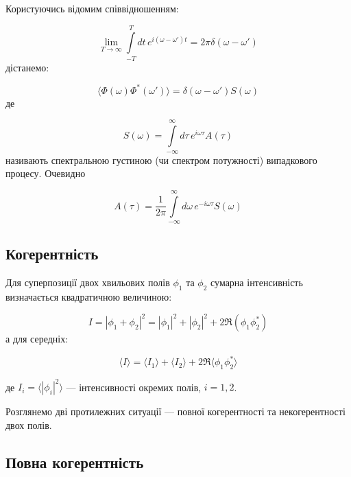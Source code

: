 Користуючись відомим співвідношенням:

\begin{equation*}
\lim_{T \to \infty} \int\limits_{-T}^{T} dt \, e^{i(\omega - \omega')t} = 2\pi \delta(\omega - \omega')
\end{equation*}
дістанемо:

\begin{equation}
\langle \Phi(\omega) \Phi^{*}(\omega') \rangle = \delta(\omega - \omega') S(\omega)
\label{eq:spectral_density}
\end{equation}
де

\begin{equation*}
S(\omega) = \int\limits_{-\infty}^{\infty} d\tau \, e^{i\omega \tau} A(\tau)
\end{equation*}
називають спектральною густиною (чи спектром потужності) випадкового процесу. Очевидно

\begin{equation*}
A(\tau) = \frac{1}{2\pi} \int\limits_{-\infty}^{\infty} d\omega \, e^{-i\omega \tau} S(\omega)
\end{equation*}

\subsection*{Когерентність}

Для суперпозиції двох хвильових полів \(\phi_1\) та \(\phi_2\) сумарна інтенсивність визначається квадратичною величиною:

\begin{equation*}
I = |\phi_1 + \phi_2|^2 = |\phi_1|^2 + |\phi_2|^2 + 2 \Re(\phi_1 \phi_2^{*})
\end{equation*}
%
а для середніх:

\begin{equation}
\langle I \rangle = \langle I_1 \rangle + \langle I_2 \rangle + 2 \Re \langle \phi_1 \phi_2^{*} \rangle
\label{eq:intensity}
\end{equation}

де \( I_i = \langle |\phi_i|^2 \rangle \) --- інтенсивності окремих полів, \( i = 1, 2 \).

Розглянемо дві протилежних ситуації --- повної когерентності та некогерентності двох полів.

\subsection*{Повна когерентність}

